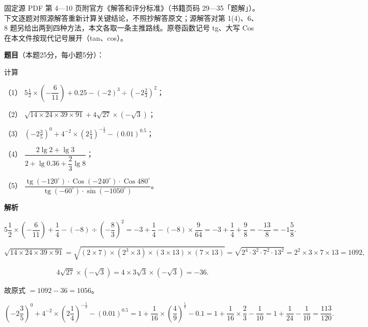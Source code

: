 

\begin{gktip}
固定源 PDF 第 4—10 页附官方《解答和评分标准》（书籍页码 29—35「题解」）。下文逐题对照源解答重新计算关键结论，不照抄解答原文；源解答对第 1(4)、6、8 题另给出两到四种方法，本文各取一条主推路线。原卷函数记号 tg、大写 Cos 在本文件按现代记号展开（tan、cos）。
\end{gktip}

\begin{answer}

\textbf{题目}（本题25分，每小题5分）：

计算

（1） $5\frac{1}{2}\times\left(-\dfrac{6}{11}\right)+0.25-(-2)^3\div\left(-2\frac{2}{3}\right)^2$；

（2） $\sqrt{14\times24\times39\times91}+4\sqrt{27}\times(-\sqrt3)$；

（3） $\left(-2\frac{3}{5}\right)^0+4^{-2}\times\left(2\frac{1}{4}\right)^{-\frac{1}{2}}-(0.01)^{0.5}$；

（4） $\dfrac{2\lg2+\lg3}{2+\lg0.36+\dfrac{2}{3}\lg8}$；

（5） $\dfrac{\operatorname{tg}(-120^\circ)\cdot\operatorname{Cos}(-240^\circ)\cdot\operatorname{Cos}480^\circ}{\operatorname{tg}(-60^\circ)\cdot\sin(-1050^\circ)}$。

\textbf{解析}


\nopagebreak[4]
\[
5\frac{1}{2}\times\left(-\frac{6}{11}\right)+\frac{1}{4}-(-8)\div\left(-\frac{8}{3}\right)^2
=-3+\frac{1}{4}-(-8)\times\frac{9}{64}
=-3+\frac{1}{4}+\frac{9}{8}=-\frac{13}{8}=-1\frac{5}{8}.
\]


\nopagebreak[4]
\[
\sqrt{14\times24\times39\times91}
=\sqrt{(2\times7)\times(2^3\times3)\times(3\times13)\times(7\times13)}
=\sqrt{2^4\cdot3^2\cdot7^2\cdot13^2}=2^2\times3\times7\times13=1092,
\]

\nopagebreak[4]
\[
4\sqrt{27}\times(-\sqrt3)=4\times3\sqrt3\times(-\sqrt3)=-36.
\]

故原式 $=1092-36=1056$。


\nopagebreak[4]
\[
\left(-2\frac{3}{5}\right)^0+4^{-2}\times\left(2\frac{1}{4}\right)^{-\frac{1}{2}}-(0.01)^{0.5}
=1+\frac{1}{16}\times\left(\frac{4}{9}\right)^{\frac{1}{2}}-0.1
=1+\frac{1}{16}\times\frac{2}{3}-\frac{1}{10}
=1+\frac{1}{24}-\frac{1}{10}=\frac{113}{120}.
\]


\end{answer}
